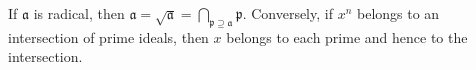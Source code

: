 If $\mathfrak a$ is radical, then $\mathfrak a=\sqrt{\mathfrak a}=\bigcap_{\mathfrak p\supseteq\mathfrak a}\mathfrak p$. Conversely, if $x^n$ belongs to an intersection of prime ideals, then $x$ belongs to each prime and hence to the intersection.
